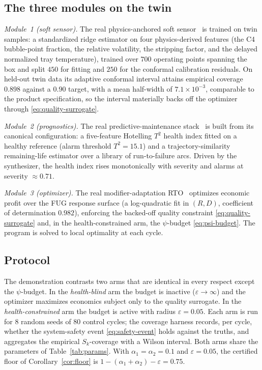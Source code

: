 \documentclass[review,12pt]{elsarticle}
\theoremstyle{definition}
\begin{document}
\subsection{The three modules on the twin}
\label{sec:modules}

\emph{Module~1 (soft sensor).} The real physics-anchored soft
sensor~\citep{busico_m1} is trained on twin samples: a standardized ridge estimator
on four physics-derived features (the C4 bubble-point fraction, the relative
volatility, the stripping factor, and the delayed normalized tray temperature),
trained over $700$ operating points spanning the box and split $450$ for fitting
and $250$ for the conformal calibration residuals. On held-out twin data its adaptive conformal
interval attains empirical coverage $0.898$ against a $0.90$ target, with a mean
half-width of $7.1\times10^{-3}$, comparable to the product specification, so the
interval materially backs off the optimizer through
\eqref{eq:quality-surrogate}.

\emph{Module~2 (prognostics).} The real predictive-maintenance
stack~\citep{busico_m2} is built from its canonical configuration: a five-feature
Hotelling $T^{2}$ health index fitted on a healthy reference (alarm threshold
$T^{2}=15.1$) and a trajectory-similarity remaining-life estimator over a library of
run-to-failure arcs. Driven by the synthesizer, the health index rises
monotonically with severity and alarms at severity $\approx\!0.71$.

\emph{Module~3 (optimizer).} The real modifier-adaptation
RTO~\citep{busico_m3} optimizes economic profit over the FUG response surface
(a log-quadratic fit in $(R,D)$, coefficient of determination $0.982$), enforcing
the backed-off quality constraint \eqref{eq:quality-surrogate} and, in the
health-constrained arm, the $\psi$-budget \eqref{eq:psi-budget}. The program is
solved to local optimality at each cycle.

\subsection{Protocol}
\label{sec:protocol}

The demonstration contrasts two arms that are identical in every respect except the
$\psi$-budget. In the \emph{health-blind} arm the budget is inactive
($\varepsilon\to\infty$) and the optimizer maximizes economics subject only to the
quality surrogate. In the \emph{health-constrained} arm the budget is active with
radius $\varepsilon=0.05$. Each arm is run for $8$ random seeds of $80$ control
cycles; the coverage harness records, per cycle, whether the system-safety event
\eqref{eq:safety-event} holds against the truths, and aggregates the empirical
$S_k$-coverage with a Wilson interval. Both arms share the parameters of
Table~\ref{tab:params}. With $\alpha_1=\alpha_2=0.1$ and $\varepsilon=0.05$, the
certified floor of Corollary~\ref{cor:floor} is
$1-(\alpha_1+\alpha_2)-\varepsilon = 0.75$.
\end{document}
